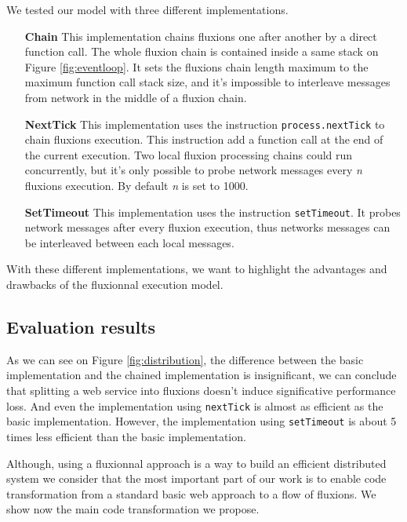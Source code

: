 We tested our model with three different implementations.

\begin{itemize}
	\item[\textbf{Chain}]
		This implementation chains fluxions one after another by a direct function call.
		The whole fluxion chain is contained inside a same stack on Figure \ref{fig:eventloop}.
		It sets the fluxions chain length maximum to the maximum function call stack size, and it's impossible to interleave messages from network in the middle of a fluxion chain.

	\item[\textbf{NextTick}]
		This implementation uses the instruction \texttt{process.nextTick} to chain fluxions execution.
		This instruction add a function call at the end of the current execution.
		Two local fluxion processing chains could run concurrently, but it's only possible to probe network messages every \textit{n} fluxions execution.
		By default \textit{n} is set to 1000.

	\item[\textbf{SetTimeout}]
		This implementation uses the instruction \texttt{setTimeout}.
		It probes network messages after every fluxion execution, thus networks messages can be interleaved between each local messages.
\end{itemize}

With these different implementations, we want to highlight the advantages and drawbacks of the fluxionnal execution model.

\subsection{Evaluation results}

% 

% 

As we can see on Figure \ref{fig:distribution}, the difference between the basic implementation and the chained implementation is insignificant, we can conclude that splitting a web service into fluxions doesn't induce significative performance loss.
And even the implementation using \texttt{nextTick} is almost as efficient as the basic implementation.
However, the implementation using \texttt{setTimeout} is about 5 times less efficient than the basic implementation.

\TODO{}
Although, using a fluxionnal approach is a way to build an efficient distributed system we consider that the most important part of our work is to enable code transformation from a standard basic web approach to a flow of fluxions.
We show now the main code transformation we propose.